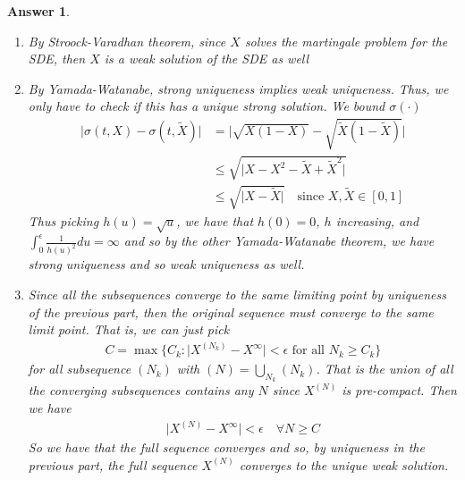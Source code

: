 \documentclass[12pt]{article}
\theoremstyle{colon}
\newtheorem*{answer}{Answer}
\begin{document}
\begin{answer}
  \leavevmode
  \begin{enumerate}[label=\alph*)]
    \item By Stroock-Varadhan theorem, since $X$ solves the martingale problem for the SDE, then $X$ is a weak solution of the SDE as well

    \item By Yamada-Watanabe, strong uniqueness implies weak uniqueness. Thus, we only have to check if this has a unique strong solution. We bound $\sigma(\cdot)$
      \begin{align*}
        \lvert \sigma(t, X) - \sigma(t, \tilde{X}) \rvert &= \lvert \sqrt{X(1-X)} - \sqrt{\tilde{X}(1-\tilde{X})} \rvert \\
        &\leq \sqrt{\lvert X - X^2 - \tilde{X} + \tilde{X}^2 \rvert} \\
        &\leq \sqrt{\lvert X - \tilde{X} \rvert} \quad \text{since } X, \tilde{X} \in [0,1]
      \end{align*}
      Thus picking $h(u) = \sqrt{u}$, we have that $h(0) = 0$, $h$ increasing, and $\int_0^\epsilon \frac{1}{h(u)^2} du = \infty$ and so by the other Yamada-Watanabe theorem, we have strong uniqueness and so weak uniqueness as well.

    \item Since all the subsequences converge to the same limiting point by uniqueness of the previous part, then the original sequence must converge to the same limit point. That is, we can just pick
    \begin{gather*}
      C = \max \{C_k : \lvert X^{(N_k)} - X^\infty \rvert < \epsilon \text{ for all } N_k \geq C_k \}
    \end{gather*}
    for all subsequence $(N_k)$ with $(N) = \bigcup_{N_k} (N_k)$. That is the union of all the converging subsequences contains any $N$ since $X^(N)$ is pre-compact. Then we have
    \begin{gather*}
      \lvert X^{(N)} - X^\infty \rvert < \epsilon \quad \forall N \geq C
    \end{gather*}
    So we have that the full sequence converges and so, by uniqueness in the previous part, the full sequence $X^{(N)}$ converges to the unique weak solution.
  \end{enumerate}
\end{answer}
\end{document}
